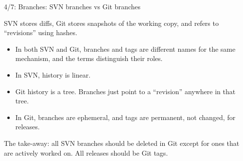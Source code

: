 \documentclass[pdf, 8pt]{beamer}
\def\NUMDECISIONS{7}
\begin{document}
\begin{frame}{4/\NUMDECISIONS: Branches: SVN branches vs Git branches}

    SVN stores diffs, Git stores snapshots of the working copy, and refers
    to ``revisions'' using hashes.

\begin{itemize}
    \item In both SVN and Git, branches and tags are different names for the
        same mechanism, and the terms distinguish their roles.
    \item In SVN, history is linear.
    \item Git history is a tree. Branches just point to a ``revision'' anywhere
        in that tree.
    \item In Git, branches are ephemeral, and tags are permanent, not changed,
        for releases.
\end{itemize}

The take-away: all SVN branches should be deleted in Git except for ones that
are actively worked on. All releases should be Git tags.

\end{frame}
\end{document}

